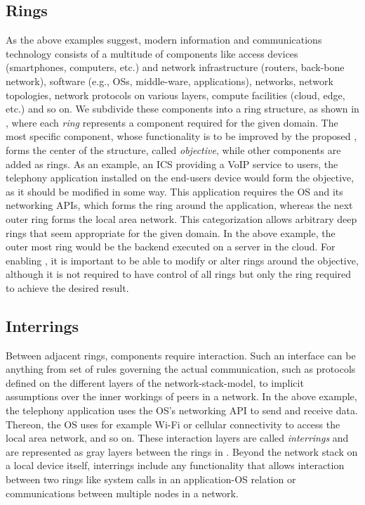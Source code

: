 \subsection{Rings}
As the above examples suggest, modern information and communications technology consists of a multitude of components like access devices (smartphones, computers, etc.) and network infrastructure (routers, back-bone network), software (e.g., OSs, middle-ware, applications), networks, network topologies, network protocols on various layers, compute facilities (cloud, edge, etc.) and so on.
We subdivide these components into a ring structure, as shown in , where each \emph{ring} represents a component required for the given domain.
The most specific component, whose functionality is to be improved by the proposed \mm, forms the center of the structure, called \emph{objective}, while other components are added as rings.
As an example, an ICS providing a VoIP service to users, the telephony application installed on the end-users device would form the objective, as it should be modified in some way.
This application requires the OS and its networking APIs, which forms the ring around the application, whereas the next outer ring forms the local area network.
This categorization allows arbitrary deep rings that seem appropriate for the given domain.
In the above example, the outer most ring would be the backend executed on a server in the cloud.
For enabling \mm, it is important to be able to modify or alter rings around the objective, although it is not required to have control of all rings but only the ring required to achieve the desired result.


\subsection{Interrings}
Between adjacent rings, components require interaction.
Such an interface can be anything from set of rules governing the actual communication, such as protocols defined on the different layers of the network-stack-model, to implicit assumptions over the inner workings of peers in a network.
In the above example, the telephony application uses the OS's networking API to send and receive data.
Thereon, the OS uses for example Wi-Fi or cellular connectivity to access the local area network, and so on.
These interaction layers are called \emph{interrings} and are represented as gray layers between the rings in .
Beyond the network stack on a local device itself, interrings include any functionality that allows interaction between two rings like system calls in an application-OS relation or communications between multiple nodes in a network.



